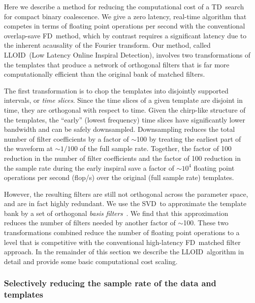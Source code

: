 \documentclass[preprint2]{aastex}
\newcommand{\SVD}{SVD}%
\newcommand{\flops}{flop/s}
\newcommand{\lloid}{LLOID}%
\newcommand{\TD}{TD}%
\newcommand{\FD}{FD}%
\begin{document}
Here we describe a method for reducing the computational cost of a \TD\ search
for compact binary coalescence.  We give a zero latency, real-time algorithm
that competes in terms of floating point operations per second with the
conventional overlap-save \FD\ method, which by contrast requires a significant latency due
to the inherent acausality of the Fourier transform.  Our method, called \lloid\
(Low Latency Online Inspiral Detection), involves two transformations of the
templates that produce a network of orthogonal filters that is far more
computationally efficient than the original bank of matched filters.

The first transformation is to chop the templates into disjointly supported
intervals, or \emph{time slices}.  Since the time slices of a given template
are disjoint in time, they are orthogonal with respect to time.  Given the
chirp-like structure of the templates, the ``early'' (lowest frequency) time
slices have significantly lower bandwidth and can be safely downsampled.
Downsampling reduces the total number of filter coefficients by a factor of
$\sim$100 by treating the earliest part of the waveform at $\sim$$1/100$ of
the full sample rate.  Together, the factor of 100 reduction in the number of
filter coefficients and the factor of 100 reduction in the sample rate during the early inspiral save a
factor of $\sim$$10^4$ floating point operations per second (\flops) over the
original (full sample rate) templates.

However, the resulting filters are still not
orthogonal across the parameter space, and are in fact highly redundant.
We use the \SVD\ to approximate the template bank by a set of orthogonal
\emph{basis filters}~\citep{Cannon:2010p10398}.  We find that this approximation
reduces the number of filters needed by another factor of $\sim$100.  These two
transformations combined reduce the number of floating point operations
to a level that is competitive with the conventional high-latency \FD\
matched filter approach.  In the remainder of this section we describe the
\lloid\ algorithm in detail and provide some basic computational cost scaling.

\subsubsection{Selectively reducing the sample rate of the data and templates}
\label{sec:time-slices}
\end{document}
